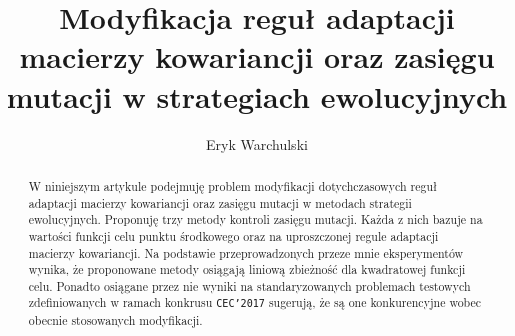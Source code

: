 

\title{Modyfikacja reguł adaptacji macierzy kowariancji oraz zasięgu mutacji w strategiach ewolucyjnych}
\author{Eryk Warchulski}



\maketitle

\begin{abstract}
  W niniejszym artykule podejmuję problem modyfikacji dotychczasowych reguł adaptacji macierzy kowariancji oraz zasięgu mutacji w metodach strategii ewolucyjnych.
  Proponuję trzy metody kontroli zasięgu mutacji. Każda z nich bazuje na wartości funkcji celu punktu środkowego oraz na uproszczonej regule adaptacji macierzy kowariancji.
  Na podstawie przeprowadzonych przeze mnie eksperymentów wynika, że proponowane metody osiągają liniową zbieżność dla kwadratowej funkcji celu. Ponadto osiągane przez nie wyniki na standaryzowanych problemach testowych zdefiniowanych w ramach konkrusu \texttt{CEC'2017} sugerują, że są one konkurencyjne wobec obecnie stosowanych modyfikacji. 
\end{abstract}









